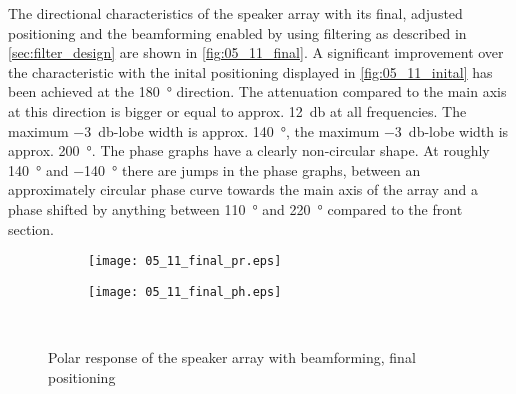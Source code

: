 The directional characteristics of the speaker array with its final, adjusted positioning and the beamforming enabled by using filtering as described in \autoref{sec:filter_design} are shown in \autoref{fig:05_11_final}. A significant improvement over the characteristic with the inital positioning displayed in \autoref{fig:05_11_inital} has been achieved at the \SI{180}{\degree} direction. The attenuation compared to the main axis at this direction is bigger or equal to approx. \SI{12}{\decibel} at all frequencies. The maximum \SI{-3}{\decibel}-lobe width is approx. \SI{140}{\degree}, the maximum \SI{-3}{\decibel}-lobe width is approx. \SI{200}{\degree}. The phase graphs have a clearly non-circular shape. At roughly \SI{140}{\degree} and \SI{-140}{\degree} there are jumps in the phase graphs, between an approximately circular phase curve towards the main axis of the array and a phase shifted by anything between \SI{110}{\degree} and \SI{220}{\degree} compared to the front section.

\begin{figure}[h]
\begin{subfigure}[c]{0.5\textwidth}
\texttt{[image: 05\_11\_final\_pr.eps]}
\label{fig:05_11_final_pr}
\end{subfigure}
\begin{subfigure}[c]{0.5\textwidth}
\texttt{[image: 05\_11\_final\_ph.eps]}
\label{fig:05_11_final_ph}
\end{subfigure}\\
\caption{Polar response of the speaker array with beamforming, final positioning}  
\label{fig:05_11_final}
\end{figure}